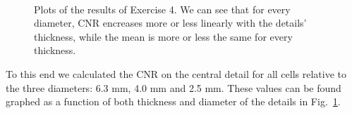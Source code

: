 \documentclass[a4paper]{article}
\begin{document}
\begin{figure}[!hbt]
	\centering
  \quad
  \\
  \quad
  \caption{Plots of the results of Exercise 4. We can see that for every diameter, CNR encreases more or less linearly with the details' thickness, while the mean is more or less the same for every thickness.}
  \label{fig:plots_ex4}
\end{figure}

To this end we calculated the CNR on the central detail for all cells relative to the three diameters: 6.3 mm, 4.0 mm and 2.5 mm. These values can be found graphed as a function of both thickness and diameter of the details in Fig.~\ref{fig:plots_ex4}.
\end{document}
